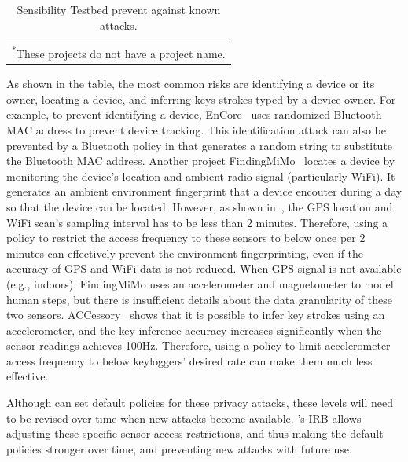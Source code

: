 \begin{table}
\begin{tabular}{|l|l|l|}
\multicolumn{3}{l}{\textsuperscript{*}\scriptsize These projects do not have a project name.} \\ 

\end{tabular}
\egroup

\caption{\small Sensibility Testbed prevent against known attacks. 
}
\label{tab:policy}
\end{table}

As shown in the table, the most common risks are identifying a device or its 
owner, locating a device, and inferring keys strokes typed by a device owner. 
For example, to prevent identifying a device, EnCore~\cite{aditya2014encore} 
uses randomized Bluetooth MAC address to prevent device tracking. This 
identification attack can also be
prevented by a Bluetooth policy in \sysname that generates a random string to 
substitute the Bluetooth MAC address. Another project FindingMiMo~\cite{shin2011findingmimo} 
locates a device by monitoring the device's location and ambient radio signal 
(particularly WiFi). It generates an ambient environment fingerprint that a 
device encouter during a day so that the device can be located. However, as 
shown in~\cite{shin2011findingmimo}, the GPS location and WiFi scan's sampling 
interval has to be less than 2 minutes. Therefore, using a \sysname policy to 
restrict the access frequency to these sensors to below once per 2 minutes can 
effectively prevent the environment fingerprinting, even if the accuracy of GPS 
and WiFi data is not reduced. When GPS signal is not available (e.g., indoors), 
FindingMiMo uses an accelerometer and magnetometer to model human steps,
but there is insufficient details about the data granularity of these two sensors. 
ACCessory~\cite{owusu2012accessory} shows that it is possible to infer key 
strokes using an accelerometer, and the key inference accuracy increases 
significantly when the sensor readings achieves 100Hz. Therefore, using a 
policy to limit accelerometer access frequency to below keyloggers' desired 
rate can make them much less effective. 

Although \sysname can set default policies for these privacy attacks, these 
levels will need to be revised over time when new attacks become available. 
\sysname's IRB allows adjusting these specific sensor access restrictions, 
and thus making the default policies stronger over time, and preventing new 
attacks with future use.

